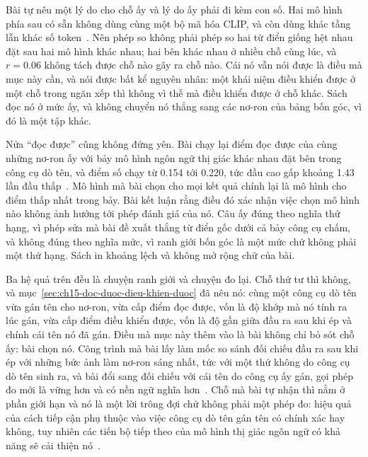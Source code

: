 Bài tự nêu một lý do cho chỗ ấy và lý do ấy phải đi kèm con số. Hai mô hình phía
sau có sẵn không dùng cùng một bộ mã hóa CLIP, và còn dùng khác tầng lẫn khác số
token~\autocite{p32cbmsae}. Nên phép so không phải phép so hai từ điển giống hệt
nhau đặt sau hai mô hình khác nhau; hai bên khác nhau ở nhiều chỗ cùng lúc, và
$r = 0.06$ không tách được chỗ nào gây ra chỗ nào. Cái nó vẫn nói được là điều
mà mục này cần, và nói được bất kể nguyên nhân: một khái niệm điều khiển được ở
một chỗ trong ngăn xếp thì không vì thế mà điều khiển được ở chỗ khác. Sách đọc
nó ở mức ấy, và không chuyển nó thẳng sang các nơ-ron của bảng bốn góc, vì đó là
một tập khác.

%
Nửa \enquote{đọc được} cũng không đứng yên. Bài chạy lại điểm đọc được của cùng
những nơ-ron ấy với bảy mô hình ngôn ngữ thị giác khác nhau đặt bên trong công
cụ dò tên, và điểm số chạy từ 0.154 tới 0.220, tức đầu cao gấp khoảng 1.43 lần
đầu thấp~\autocite{p32cbmsae}. Mô hình mà bài chọn cho mọi kết quả chính lại là mô
hình cho điểm thấp nhất trong bảy. Bài kết luận rằng điều đó xác nhận việc chọn
mô hình nào không ảnh hưởng tới phép đánh giá của nó. Câu ấy đúng theo nghĩa thứ
hạng, vì phép sửa mà bài đề xuất thắng từ điển gốc dưới cả bảy công cụ chấm, và
không đúng theo nghĩa mức, vì ranh giới bốn góc là một mức chứ không phải một
thứ hạng. Sách in khoảng lệch và không mở rộng chữ của bài.

%
Ba hệ quả trên đều là chuyện ranh giới và chuyện đo lại. Chỗ thứ tư thì không,
và mục~\ref{sec:ch15-doc-duoc-dieu-khien-duoc} đã nêu nó: cùng một công cụ dò
tên vừa gán tên cho nơ-ron, vừa cấp điểm đọc được, vốn là độ khớp mà nó tính ra
lúc gán, vừa cấp điểm điều khiển được, vốn là độ gần giữa đầu ra sau khi ép và
chính cái tên nó đã gán. Điều mà mục này thêm vào là bài không chỉ bỏ sót chỗ
ấy: bài chọn nó. Công trình mà bài lấy làm mốc so sánh đối chiếu đầu ra sau khi
ép với những bức ảnh làm nơ-ron sáng nhất, tức với một thứ không do công cụ dò
tên sinh ra, và bài đổi sang đối chiếu với cái tên do công cụ ấy gán, gọi phép
đo mới là vững hơn và có nền ngữ nghĩa hơn~\autocite{p32cbmsae}. Chỗ mà bài tự
nhận thì nằm ở phần giới hạn và nó là một lời trông đợi chứ không phải một phép
đo: hiệu quả của cách tiếp cận phụ thuộc vào việc công cụ dò tên gán tên có
chính xác hay không, tuy nhiên các tiến bộ tiếp theo của mô hình thị giác ngôn
ngữ có khả năng sẽ cải thiện nó~\autocite{p32cbmsae}.

